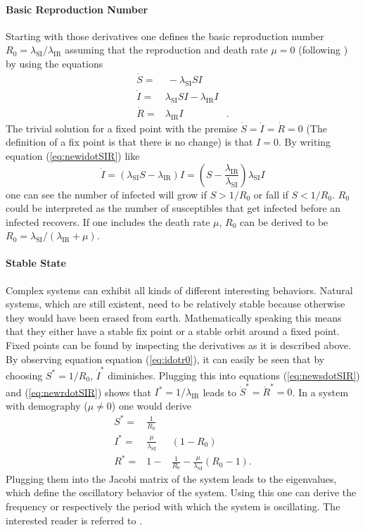 \paragraph{Basic Reproduction Number}
Starting with those derivatives one defines the basic reproduction number $R_0=\lambda_\text{SI} / \lambda_\text{IR}$ assuming that the reproduction and death rate $\mu=0$ (following \citep{AND92}) by using the equations
\begin{eqnarray}
\dot{S} =& \ -\lambda_\text{SI} SI &  \label{eq:newsdotSIR}\\ 
\dot{I} =& \lambda_\text{SI} SI - \lambda_\text{IR} I  & \label{eq:newidotSIR}\\
\dot{R} =& \lambda_\text{IR} I \label{eq:newrdotSIR}&.
\end{eqnarray}
The trivial solution for a fixed point with the premise $\dot{S} = \dot{I} =\dot{R} = 0$ (The definition of a fix point is that there is no change) is that $I=0$. By writing equation (\ref{eq:newidotSIR}) like 
\begin{equation}
\dot{I} = (\lambda_\text{SI} S -\lambda_\text{IR}) I = \left( S-\frac{\lambda_\text{IR}}{\lambda_\text{SI}} \right) \lambda_\text{SI} I \label{eq:idotr0}
\end{equation}
one can see the number of infected will grow if $S > 1/R_0$ or fall if $S < 1/R_0$. $R_0$ could be interpreted as the number of susceptibles that get infected before an infected recovers. If one includes the death rate $\mu$, $R_0$ can be derived to be $R_0=\lambda_\text{SI} / (\lambda_\text{IR}+\mu)$.

\paragraph{Stable State}
Complex systems can exhibit all kinds of different interesting behaviors. Natural systems, which are still existent, need to be relatively stable because otherwise they would have been erased from earth. Mathematically speaking this means that they either have a stable fix point or a stable orbit around a fixed point. Fixed points can be found by inspecting the derivatives as it is described above. By observing equation equation (\ref{eq:idotr0}), it can easily be seen that by choosing $S^*=1/R_0$, $\dot{I}^*$ diminishes.
Plugging this into equations (\ref{eq:newsdotSIR}) and (\ref{eq:newrdotSIR}) shows that $I^*= 1/\lambda_\text{IR}$ leads to $\dot{S}^*=\dot{R}^* =0$.
In a system with demography ($\mu \neq 0$) one would derive
\begin{eqnarray}
S^* =& \frac{1}{R_0}& \\ 
I^* =& \frac{\mu}{\lambda_\text{SI}}&(1-R_0) \\
R^* =& 1-&\frac{1}{R_0}-\frac{\mu}{\lambda_\text{SI}}(R_0 -1).
\end{eqnarray}
Plugging them into the Jacobi matrix of the system leads to the eigenvalues, which define the oscillatory behavior of the system. Using this one can derive the frequency or respectively the period with which the system is oscillating. The interested reader is referred to \citep{matt2008modeling}. 
